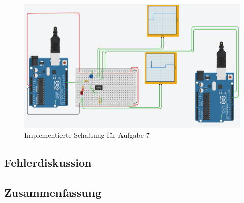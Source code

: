 \begin{figure}
    \centering
    \includegraphics{pictures/a7-praktik.png}
    \caption{Implementierte Schaltung für Aufgabe 7}
    \label{fig:a7-implementierung}
\end{figure}


\subsection{Fehlerdiskussion}
\label{subsec:a7-fehlerdiskussion}

\subsection{Zusammenfassung}
\label{subsec:a7-zusammenfassung}
